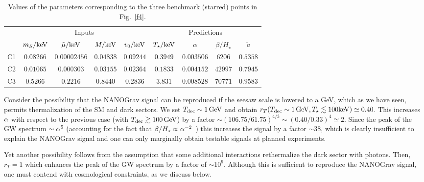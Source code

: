 \documentclass[a4paper,11pt]{article}
\begin{document}
\begin{table}[t]
\begin{center}
\begin{tabular}{ l | cccc | cccc }
 \hline\hline
& \multicolumn{4}{c|}{Inputs} & \multicolumn{4}{c}{Predictions} \\
 \cline{2-9}
 &  $m_S/{\rm keV}$ & $\tilde{\mu}/{\rm keV}$ & $M/{\rm keV}$ & $v_0/{\rm keV}$ & $T_\star/{\rm keV}$ & $\alpha$ & $\beta / H_\star$ & $\widetilde{a}$  \\\hline\hline
C1 & $0.08266$ & $0.00002456$ & $0.04838$ & $0.09244$ & $0.3949$ & $0.003506$ & $6206$ & $0.5358$ \\
C2 & $0.01065$ & $0.000303$ & $0.03155$ & $0.02364$ & $0.1833$ & $0.004152$ & $42997$ & $0.7945$ \\
C3 & $0.5266$ & $0.2216$ & $0.8440$ & $0.2836$ & $3.831$ & $0.008528$ & $70771$ & $0.9583$ \\
 \hline\hline
\end{tabular}
\end{center}
\caption{Values of the parameters corresponding to the three benchmark (starred) points in Fig.~\ref{f4}.}
\label{tab:samples_lowT1}
\end{table}

Consider the possibility that the NANOGrav signal can be reproduced if the seesaw scale is lowered to a GeV, which as we have seen, permits thermalization of the SM and dark sectors. We set $T_{\rm dec}\sim 1\,{\rm GeV}$ and obtain
$r_T(T_{\rm dec} \sim 1\,{\rm GeV},T_\star \lesssim {\rm 100 keV}) \simeq 0.40$. This increases $\alpha$
with respect to the previous case (with $T_{\rm dec} \gtrsim 100\,{\rm GeV}$) by a factor 
$\sim (106.75/61.75)^{4/3} \sim (0.40/0.33)^{4} \simeq 2$. Since the peak of the GW spectrum
$\sim \alpha^5$ (accounting for the fact that $\beta/H_\star\propto \alpha^{-2}$~\cite{Ellis:2020awk})
this increases the signal by a factor  $\sim 38$, which is clearly insufficient to explain the NANOGrav signal and 
one can only marginally obtain testable signals at planned experiments.

Yet another possibility follows from the assumption that some additional interactions rethermalize the dark sector
with photons. Then, $r_T = 1$ which enhances the peak of the GW spectrum  by a factor of $\sim 10^9$. Although this is sufficient to reproduce the NANOGrav signal, one must contend with cosmological constraints, as we discuss below.
\end{document}

